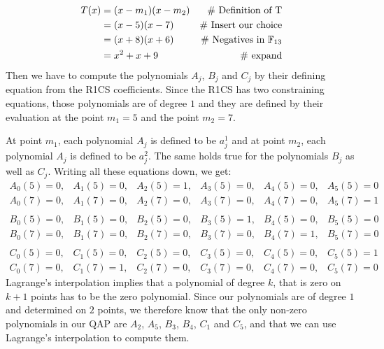 \begin{example}[3-factorization]
\begin{align*}
T(x) & = (x-m_1)(x-m_2) & \text{\# Definition of T}\\
     & = (x-5)(x-7)  & \text{\# Insert our choice}\\
     & = (x+8)(x+6)  & \text{\# Negatives in } \mathbb{F}_{13}\\
     & = x^2 + x +9 & \text{\# expand}
\end{align*}
Then we have to compute the polynomials $A_j$, $B_j$ and $C_j$ by their defining equation from the R1CS coefficients. Since the R1CS has two constraining equations, those polynomials are of degree $1$ and they are defined by their evaluation at the point $m_1=5$ and the point $m_2=7$. 

At point $m_1$, each polynomial $A_j$ is defined to be $a_j^1$ and at point $m_2$, each polynomial $A_j$ is defined to be $a_j^2$. The same holds true for the polynomials $B_j$ as well as $C_j$. Writing all these equations down, we get:
$$
\begin{array}{llllll}
A_0(5)=0, & A_1(5)=0, & A_2(5)=1, & A_3(5)=0, & A_4(5)=0, & A_5(5)=0 \\
A_0(7)=0, & A_1(7)=0, & A_2(7)=0, & A_3(7)=0, & A_4(7)=0, & A_5(7)=1\\
\\
B_0(5)=0, & B_1(5)=0, & B_2(5)=0, & B_3(5)=1, & B_4(5)=0, & B_5(5)=0 \\
B_0(7)=0, & B_1(7)=0, & B_2(7)=0, & B_3(7)=0, & B_4(7)=1, & B_5(7)=0\\
\\
C_0(5)=0, & C_1(5)=0, & C_2(5)=0, & C_3(5)=0, & C_4(5)=0, & C_5(5)=1 \\
C_0(7)=0, & C_1(7)=1, & C_2(7)=0, & C_3(7)=0, & C_4(7)=0, & C_5(7)=0
\end{array}
$$
Lagrange's interpolation implies that a polynomial of degree $k$, that is zero on $k+1$ points has to be the zero polynomial. Since our polynomials are of degree $1$ and determined on $2$ points, we therefore know that the only non-zero polynomials in our QAP are $A_2$, $A_5$, $B_3$, $B_4$, $C_1$ and $C_5$, and that we can use Lagrange's interpolation to compute them. 


\end{example}
